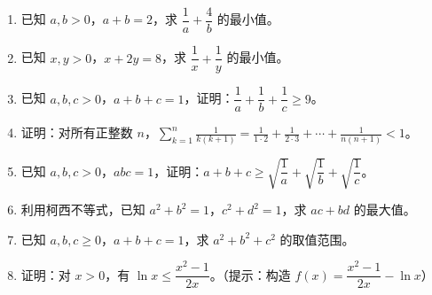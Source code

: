 \documentclass[12pt, a4paper]{ctexart}
\begin{document}
\begin{enumerate}
  \item 已知 $a,b>0$，$a+b=2$，求 $\dfrac{1}{a}+\dfrac{4}{b}$ 的最小值。

  \item 已知 $x,y>0$，$x+2y=8$，求 $\dfrac{1}{x}+\dfrac{1}{y}$ 的最小值。

  \item 已知 $a,b,c>0$，$a+b+c=1$，证明：$\dfrac{1}{a}+\dfrac{1}{b}+\dfrac{1}{c} \geqslant 9$。

  \item 证明：对所有正整数 $n$，$\displaystyle\sum_{k=1}^{n}\frac{1}{k(k+1)} = \frac{1}{1\cdot 2}+\frac{1}{2\cdot 3}+\cdots+\frac{1}{n(n+1)} < 1$。

  \item 已知 $a,b,c>0$，$abc=1$，证明：$a+b+c \geqslant \sqrt{\dfrac{1}{a}}+\sqrt{\dfrac{1}{b}}+\sqrt{\dfrac{1}{c}}$。

  \item 利用柯西不等式，已知 $a^2+b^2=1$，$c^2+d^2=1$，求 $ac+bd$ 的最大值。

  \item 已知 $a,b,c \geqslant 0$，$a+b+c=1$，求 $a^2+b^2+c^2$ 的取值范围。

  \item 证明：对 $x>0$，有 $\ln x \leqslant \dfrac{x^2-1}{2x}$。（提示：构造 $f(x) = \dfrac{x^2-1}{2x}-\ln x$）
\end{enumerate}

\vspace{20pt}
\end{document}
